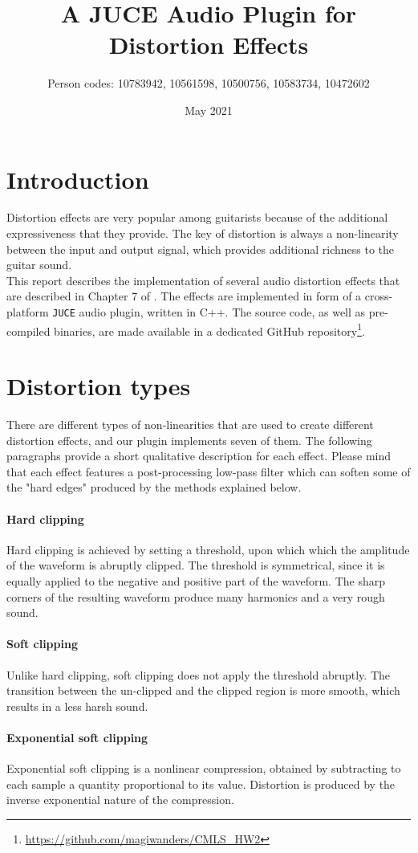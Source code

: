 \documentclass{article}
\title{\textbf{A JUCE Audio Plugin for Distortion Effects}}
\author{Person codes: 10783942, 10561598, 10500756, 10583734, 10472602}
\date{May 2021}
\newcommand{\code}{\texttt}
\begin{document}
\maketitle

\section{Introduction}
Distortion effects are very popular among guitarists because of the additional expressiveness that they provide. The key of distortion is always a non-linearity between the input and output signal, which provides additional richness to the guitar sound.\\
This report describes the implementation of several audio distortion effects that are described in Chapter 7 of \cite{reiss2014audio}. The effects are implemented in form of a cross-platform \code{JUCE} \cite{JUCE} audio plugin, written in C++. The source code, as well as pre-compiled binaries, are made available in a dedicated GitHub repository\footnote{\url{https://github.com/magiwanders/CMLS_HW2}}.

\section{Distortion types}
There are different types of non-linearities that are used to create different distortion effects, and our plugin implements seven of them. The following paragraphs provide a short qualitative description for each effect. Please mind that each effect features a post-processing low-pass filter which can soften some of the "hard edges" produced by the methods explained below. 
\paragraph{Hard clipping} 
Hard clipping is achieved by setting a threshold, upon which which the amplitude of the waveform is abruptly clipped. The threshold is symmetrical, since it is equally applied to the negative and positive part of the waveform. The sharp corners of the resulting waveform produce many harmonics and a very rough sound.
\paragraph{Soft clipping}
Unlike hard clipping, soft clipping does not apply the threshold abruptly. The transition between the un-clipped and the clipped region is more smooth, which results in a less harsh sound. 
\paragraph{Exponential soft clipping} 
Exponential soft clipping is a nonlinear compression, obtained by subtracting to each sample a quantity proportional to its value. Distortion is produced by the inverse exponential nature of the compression. 
\end{document}
